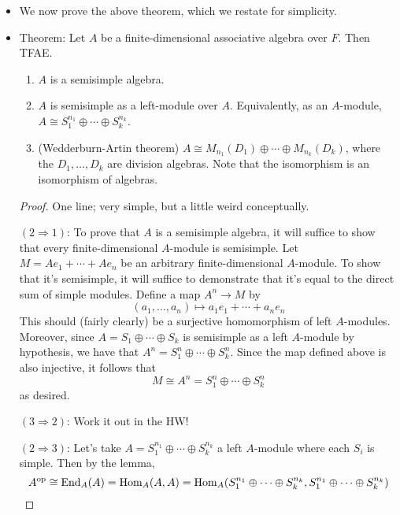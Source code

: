 \documentclass[../notes.tex]{subfiles}
\begin{document}
\begin{itemize}
\begin{proof}
    \end{proof}
    \item We now prove the above theorem, which we restate for simplicity.
    \item Theorem: Let $A$ be a finite-dimensional associative algebra over $F$. Then TFAE.
    \begin{enumerate}
        \item $A$ is a semisimple algebra.
        \item $A$ is semisimple as a left-module over $A$. Equivalently, as an $A$-module, $A\cong S_1^{n_1}\oplus\cdots\oplus S_k^{n_k}$.
        \item (Wedderburn-Artin theorem) $A\cong M_{n_1}(D_1)\oplus\cdots\oplus M_{n_k}(D_k)$, where the $D_1,\dots,D_k$ are division algebras. Note that the isomorphism is an isomorphism of algebras.
    \end{enumerate}
    \begin{proof}
        One line; very simple, but a little weird conceptually.\par
        $(2\Rightarrow 1)$: To prove that $A$ is a semisimple algebra, it will suffice to show that every finite-dimensional $A$-module is semisimple. Let $M=Ae_1+\cdots+Ae_n$ be an arbitrary finite-dimensional $A$-module. To show that it's semisimple, it will suffice to demonstrate that it's equal to the direct sum of simple modules. Define a map $A^n\to M$ by
        \begin{equation*}
            (a_1,\dots,a_n) \mapsto a_1e_1+\cdots+a_ne_n
        \end{equation*}
        This should (fairly clearly) be a surjective homomorphism of left $A$-modules. Moreover, since $A=S_1\oplus\cdots\oplus S_k$ is semisimple as a left $A$-module by hypothesis, we have that $A^n=S_1^n\oplus\cdots\oplus S_k^n$. Since the map defined above is also injective, it follows that
        \begin{equation*}
            M \cong A^n = S_1^n\oplus\cdots\oplus S_k^n
        \end{equation*}
        as desired.\par
        $(3\Rightarrow 2)$: Work it out in the HW!\par
        $(2\Rightarrow 3)$: Let's take $A=S_1^{n_1}\oplus\cdots\oplus S_k^{n_k}$ a left $A$-module where each $S_i$ is simple. Then by the lemma,
        \begin{equation*}
            A^\text{op} \cong \End_A(A)
            = \Hom_A(A,A)
            = \Hom_A(S_1^{n_1}\oplus\cdots\oplus S_k^{n_k},S_1^{n_1}\oplus\cdots\oplus S_k^{n_k})

\end{equation*}
\end{proof}
\end{itemize}
\end{document}

